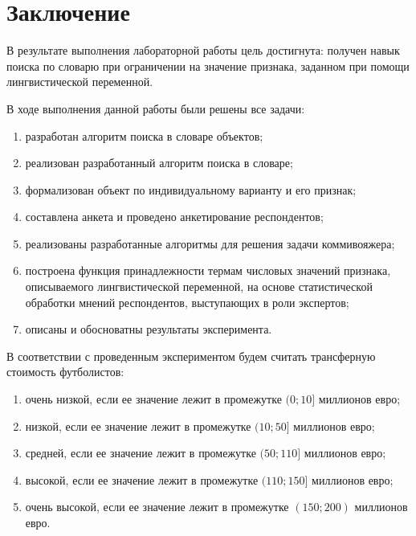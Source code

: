 \chapter*{Заключение}

В результате выполнения лабораторной работы цель достигнута: получен навык поиска по словарю при ограничении на значение признака, заданном при помощи лингвистической переменной.

В ходе выполнения данной работы были решены все задачи:
\begin{enumerate}[label={\arabic*)}]
        \item  разработан алгоритм поиска в словаре объектов;
	\item реализован разработанный алгоритм поиска в словаре;
 \item формализован объект по индивидуальному варианту и его признак;
	\item составлена анкета и проведено анкетирование респондентов;
	\item реализованы разработанные алгоритмы для решения задачи коммивояжера;
	\item построена функция принадлежности термам числовых значений признака, описываемого лингвистической переменной, на основе статистической обработки мнений респондентов, выступающих в роли экспертов;
        \item описаны и обосноватны результаты эксперимента.
\end{enumerate}

В соответствии с проведенным экспериментом будем считать трансферную стоимость футболистов:
\begin{enumerate}[label=\arabic*)]
	\item очень низкой, если ее значение лежит в промежутке $(0; 10]$ миллионов евро;
	\item низкой, если ее значение лежит в промежутке $(10; 50]$ миллионов евро;
	\item средней, если ее значение лежит в промежутке $(50; 110]$ миллионов евро;
	\item высокой, если ее значение лежит в промежутке $(110; 150]$ миллионов евро;
	\item очень высокой, если ее значение лежит в промежутке $(150; 200)$ миллионов евро.
\end{enumerate}